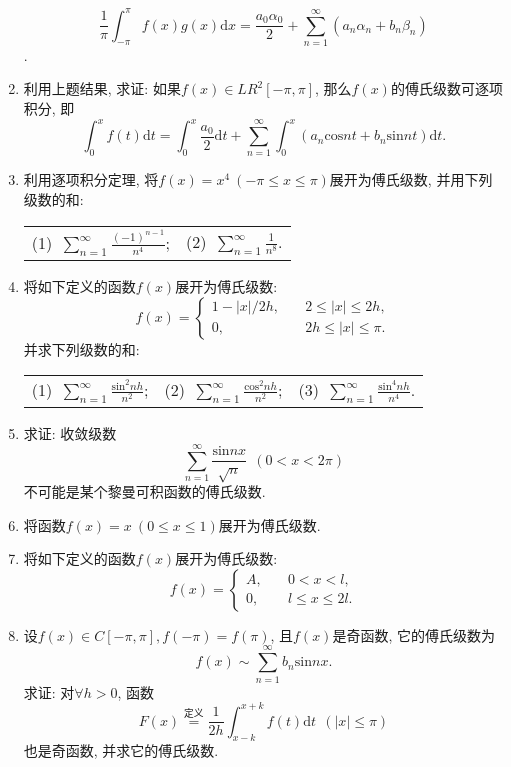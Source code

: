 \begin{enumerate}
$$\displaystyle{\frac{1}{\pi}\int_{-\pi}^{\pi}f(x)g(x)\mathrm{d}x=\frac{a_0\alpha_0}{2}+\sum\limits_{n=1}^{\infty}(a_n\alpha_n+b_n\beta_n)}$$.
\item 利用上题结果, 求证: 如果$f(x)\in LR^2[-\pi,\pi]$, 那么$f(x)$的傅氏级数可逐项积分, 即$$
\displaystyle{\int_{0}^{x}f(t)\mathrm{d}t=\int_{0}^{x}\frac{a_0}{2}\mathrm{d}t+\sum\limits_{n=1}^{\infty}\int_{0}^{x}(a_n\mathrm{cos}nt+b_n\mathrm{sin}nt)\mathrm{d}t}.$$
\item 利用逐项积分定理, 将$f(x)=x^4\ (-\pi\le x\le \pi)$展开为傅氏级数, 并用下列级数的和:
\begin{table}[H]
	\begin{tabular}{ll}
		(1)\ $\sum\limits_{n=1}^{\infty}\frac{(-1)^{n-1}}{n^4}$;\qquad \qquad \qquad \qquad \qquad&(2)\ $\sum\limits_{n=1}^{\infty}\frac{1}{n^8}$.
	\end{tabular}
\end{table}
\item 将如下定义的函数$f(x)$展开为傅氏级数:
$$f(x)=\begin{cases}
1-|x|/2h,\quad& 2\le |x| \le 2h,\\
0,\quad & 2h\le |x|\le \pi.
\end{cases}$$
并求下列级数的和:
\begin{table}[H]
	\begin{tabular}{lll}
		(1)\ $\sum\limits_{n=1}^{\infty}\frac{\mathrm{sin}^2nh}{n^2}$;\qquad \qquad\qquad&(2)\ $\sum\limits_{n=1}^{\infty}\frac{\mathrm{cos}^2nh}{n^2}$;\qquad \qquad \qquad &(3)\ $\sum\limits_{n=1}^{\infty}\frac{\mathrm{sin}^4nh}{n^4}$.
	\end{tabular}
\end{table}
\item 求证: 收敛级数$$
\sum\limits_{n=1}^{\infty}\frac{\mathrm{sin}nx}{\sqrt{n}}\ \ (0<x<2\pi)$$
不可能是某个黎曼可积函数的傅氏级数.
\item 将函数$f(x)=x\ (0\le x\le 1)$展开为傅氏级数.
\item 将如下定义的函数$f(x)$展开为傅氏级数:
$$f(x)=\begin{cases}
A,\quad &0<x<l,\\
0,\quad &l\le x\le 2l.
\end{cases}
$$
\item 设$f(x)\in C[-\pi,\pi],f(-\pi)=f(\pi)$, 且$f(x)$是奇函数, 它的傅氏级数为$$
f(x)\sim\sum\limits_{n=1}^{\infty}b_n\mathrm{sin}nx.$$
求证: 对$\forall h>0$, 函数$$
F(x)\overset{定义}{=}\frac{1}{2h}\int_{x-k}^{x+k}f(t)\mathrm{d}t \ \ (|x|\le \pi)$$
也是奇函数, 并求它的傅氏级数.
\end{enumerate}